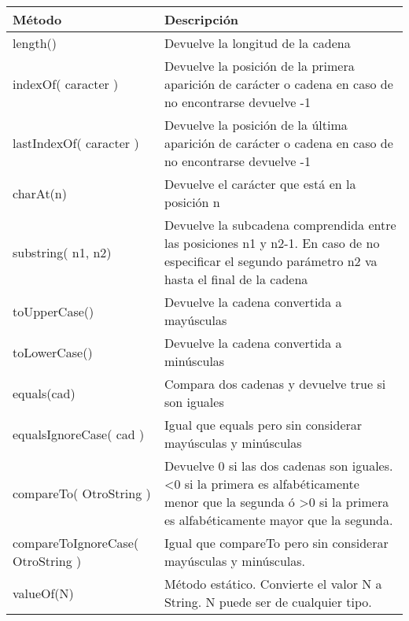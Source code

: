 \begin{tabular}{|p{4cm}|p{11cm}|}
	\hline 
	\textbf{Método}  & \textbf{Descripción}  \\ 
	\hline 
	 length() & Devuelve la longitud de la cadena   \\ 
	\hline	
	indexOf( caracter )  & Devuelve la posición de la primera aparición de carácter o cadena en caso de no encontrarse devuelve -1   \\ 
	\hline 
	lastIndexOf( caracter ) & Devuelve la posición de la última aparición de carácter o cadena en caso de no encontrarse devuelve -1  \\ 
	\hline 
	charAt(n) & Devuelve el carácter que está en la posición n   \\ 
	\hline	
	substring( n1, n2) & Devuelve la subcadena comprendida entre las posiciones n1 y n2-1. En caso de no especificar el segundo parámetro n2 va hasta el final de la cadena    \\ 
	\hline	
	toUpperCase() & Devuelve la cadena convertida a mayúsculas   \\ 
	\hline	
	toLowerCase() & Devuelve la cadena convertida a minúsculas  \\ 
	\hline	
	equals(cad) &  	Compara dos cadenas y devuelve true si son iguales  \\ 
	\hline	
	 equalsIgnoreCase( cad )  &  	Igual que equals pero sin considerar mayúsculas y minúsculas  \\ 
	\hline	
		compareTo( OtroString ) & Devuelve 0 si las dos cadenas son iguales. <0 si la primera es alfabéticamente menor que la segunda ó >0 si la primera es alfabéticamente mayor que la segunda.  \\ 
	\hline	
		compareToIgnoreCase( OtroString ) & Igual que compareTo pero sin considerar mayúsculas y minúsculas.  \\ 
	\hline	
		valueOf(N) & Método estático. Convierte el valor N a String. N puede ser de cualquier tipo.  \\ 
	\hline	
\end{tabular}